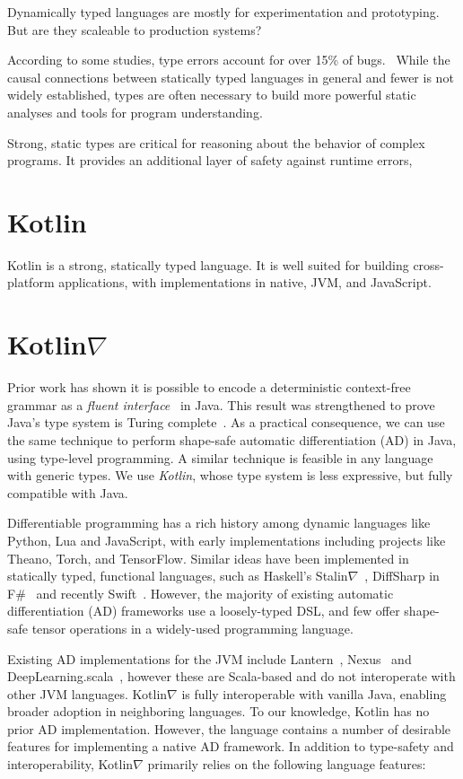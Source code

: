 \documentclass[12pt,initial,twoside,maitrise]{dms}
\numberwithin{equation}{section}
\numberwithin{table}{chapter}
\numberwithin{figure}{chapter}
\begin{document}
Dynamically typed languages are mostly for experimentation and prototyping. But are they scaleable to production systems?

According to some studies, type errors account for over 15\% of bugs.~\cite{gao2017type} While the causal connections between statically typed languages in general and fewer is not widely established, types are often necessary to build more powerful static analyses and tools for program understanding.

Strong, static types are critical for reasoning about the behavior of complex programs. It provides an additional layer of safety against runtime errors,

\section{Kotlin}

Kotlin is a strong, statically typed language. It is well suited for building cross-platform applications, with implementations in native, JVM, and JavaScript.

\section{Kotlin$\nabla$}

Prior work has shown it is possible to encode a deterministic context-free grammar as a \textit{fluent interface}~\cite{gil2016formal} in Java. This result was strengthened to prove Java's type system is Turing complete~\cite{Grigore:2017:JGT:3009837.3009871}. As a practical consequence, we can use the same technique to perform shape-safe automatic differentiation (AD) in Java, using type-level programming. A similar technique is feasible in any language with generic types. We use \textit{Kotlin}, whose type system is less expressive, but fully compatible with Java.

Differentiable programming has a rich history among dynamic languages like Python, Lua and JavaScript, with early implementations including projects like Theano, Torch, and TensorFlow. Similar ideas have been implemented in statically typed, functional languages, such as Haskell's Stalin$\nabla$~\cite{pearlmutter2008using}, DiffSharp in F\#~\cite{baydin-diffsharp} and recently Swift~\cite{swift}. However, the majority of existing automatic differentiation (AD) frameworks use a loosely-typed DSL, and few offer shape-safe tensor operations in a widely-used programming language.

Existing AD implementations for the JVM include Lantern~\cite{DBLP:journals-corr-abs-1803-10228}, Nexus~\cite{chen2017typesafe} and DeepLearning.scala~\cite{dl4s}, however these are Scala-based and do not interoperate with other JVM languages. Kotlin$\nabla$ is fully interoperable with vanilla Java, enabling broader adoption in neighboring languages. To our knowledge, Kotlin has no prior AD implementation. However, the language contains a number of desirable features for implementing a native AD framework. In addition to type-safety and interoperability, Kotlin$\nabla$ primarily relies on the following language features:
\end{document}
